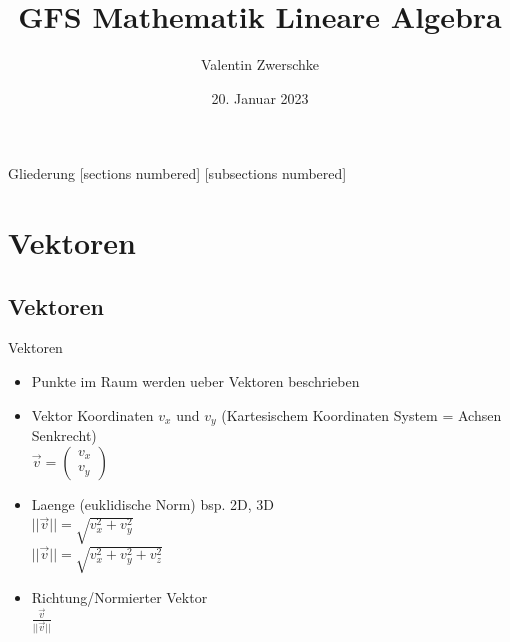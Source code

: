 \documentclass[10pt,aspectratio=169]{beamer}
\title{GFS Mathematik Lineare Algebra}
\date{20. Januar 2023}
\author{Valentin Zwerschke}
\institute{Königin-Olga-Stift Gymnasium}
\begin{document}
  \maketitle

  \begin{frame}{Gliederung}
	[sections numbered]
	[subsections numbered]
	\tableofcontents[hideallsubsections]
  \end{frame}

  \section{Vektoren}
  \subsection{Vektoren}
  \begin{frame}{Vektoren}
    \begin{minipage}{0.65\textwidth}
      \begin{itemize}
        \item Punkte im Raum werden ueber Vektoren beschrieben 
        \item Vektor Koordinaten $v_x$ und $v_y$ (Kartesischem Koordinaten System = Achsen Senkrecht)\\\vspace{0.2cm} 
        \hspace{0.3cm}$\vec{v} = \begin{pmatrix} v_x\\ v_y\end{pmatrix}$
        \vspace{0.2cm}
        \item Laenge (euklidische Norm) bsp. 2D, 3D\\
        \hspace{0.3cm}$||\vec{v}|| =  \sqrt{v_x^2 + v_y^2}$\\
        \hspace{0.3cm}$||\vec{v}|| =  \sqrt{v_x^2 + v_y^2 + v_z^2}$
        \vspace{0.2cm}
        \item Richtung/Normierter Vektor\\
        \hspace{0.25cm}\Large$\frac{\vec{v}}{||\vec{v}||}$
      \end{itemize}  
    \end{minipage}
    \begin{minipage}[c]{0.3\textwidth}
    \end{minipage}
  \end{frame}
\end{document}
